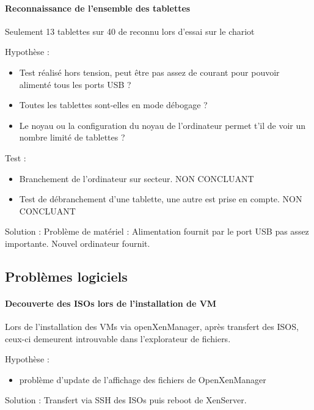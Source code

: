 \documentclass[a4paper,12pt]{extarticle}
\begin{document}
\paragraph{Reconnaissance de l'ensemble des tablettes\\}
Seulement 13 tablettes sur 40 de reconnu lors d'essai sur le chariot

Hypothèse :
\begin{itemize}
\item Test réalisé hors tension, peut être pas assez de courant pour pouvoir alimenté tous les ports USB ? 
\item Toutes les tablettes sont-elles en mode débogage ? 
\item Le noyau ou la configuration du noyau de l'ordinateur permet t'il de voir un nombre limité de tablettes ? \\
\end{itemize}

Test :
\begin{itemize}
\item Branchement de l'ordinateur sur secteur. NON CONCLUANT
\item Test de débranchement d'une tablette, une autre est prise en compte. NON CONCLUANT \\
\end{itemize}

Solution :
Problème de matériel : Alimentation fournit par le port USB pas assez importante. 
Nouvel ordinateur fournit.



\subsection{Problèmes logiciels}


\paragraph{Decouverte des ISOs lors de l'installation de VM\\}
Lors de l'installation des VMs via openXenManager, après transfert des ISOS, ceux-ci demeurent introuvable dans l'explorateur de fichiers.

Hypothèse :
\begin{itemize}
\item problème d'update de l'affichage des fichiers de OpenXenManager\\
\end{itemize}

Solution :
Transfert via SSH des ISOs puis reboot de XenServer.
\end{document}
